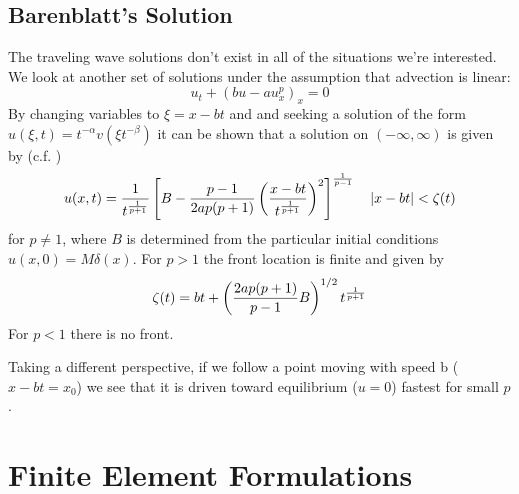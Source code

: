 \documentclass[10pt,dvips,twoside,reqno]{amsart}
\begin{document}
\subsection{Barenblatt's Solution}

The traveling wave solutions don't exist in all of the situations
we're interested. We look at another set of solutions under the
assumption that advection is linear:
\begin{equation}
  \label{eq:porousMedia}
  u_t + (b u - au^p_x)_x = 0
\end{equation}
By changing variables to $\xi = x - bt$ and and seeking a solution of
the form $u(\xi,t) = t^{-\alpha} v(\xi t^{-\beta})$ it can be shown
that a solution on $(-\infty,\infty)$ is given by (c.f.
\citep{Evans_98})
\begin{equation}
\label{eq:barenblatt}
u(x,t) = \frac{1}{t^{\frac{1}{p+1}}}\left[ B - \frac{p-1}{2a p(p+1)} \left( \frac{x-bt}{t^{\frac{1}{p+1}}} \right)^2 \right]^{\frac{1}{p-1}} \quad |x - bt| < \zeta(t)
\end{equation}
for $p \neq 1$, where $B$ is determined from the particular initial
conditions $u(x,0) = M \delta(x)$. For $p > 1$ the front location is
finite and given by
\begin{equation}
\label{eq:barenblattFront}
\zeta(t) = bt + \left( \frac{2ap(p+1)}{p-1} B \right)^{1/2} t^{\frac{1}{p+1}}
\end{equation}
For $p < 1$ there is no front. 

Taking a different perspective, if we follow a point moving with speed
b ($x - bt = x_0$) we see that it is driven toward equilibrium ($u =
0$) fastest for small $p$.
\section{Finite Element Formulations}
\end{document}

